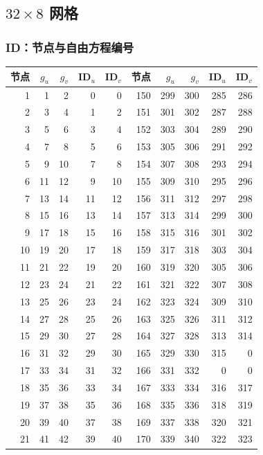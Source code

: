 \subsection{$32\times8$ 网格}
\subsubsection*{ID：节点与自由方程编号}
\small\begin{longtable}{rrrrr@{\qquad}rrrrr}
\toprule 节点 & $g_u$ & $g_v$ & ID$_u$ & ID$_v$ & 节点 & $g_u$ & $g_v$ & ID$_u$ & ID$_v$ \\ \midrule\endhead
1 & 1 & 2 & 0 & 0 & 150 & 299 & 300 & 285 & 286 \\
2 & 3 & 4 & 1 & 2 & 151 & 301 & 302 & 287 & 288 \\
3 & 5 & 6 & 3 & 4 & 152 & 303 & 304 & 289 & 290 \\
4 & 7 & 8 & 5 & 6 & 153 & 305 & 306 & 291 & 292 \\
5 & 9 & 10 & 7 & 8 & 154 & 307 & 308 & 293 & 294 \\
6 & 11 & 12 & 9 & 10 & 155 & 309 & 310 & 295 & 296 \\
7 & 13 & 14 & 11 & 12 & 156 & 311 & 312 & 297 & 298 \\
8 & 15 & 16 & 13 & 14 & 157 & 313 & 314 & 299 & 300 \\
9 & 17 & 18 & 15 & 16 & 158 & 315 & 316 & 301 & 302 \\
10 & 19 & 20 & 17 & 18 & 159 & 317 & 318 & 303 & 304 \\
11 & 21 & 22 & 19 & 20 & 160 & 319 & 320 & 305 & 306 \\
12 & 23 & 24 & 21 & 22 & 161 & 321 & 322 & 307 & 308 \\
13 & 25 & 26 & 23 & 24 & 162 & 323 & 324 & 309 & 310 \\
14 & 27 & 28 & 25 & 26 & 163 & 325 & 326 & 311 & 312 \\
15 & 29 & 30 & 27 & 28 & 164 & 327 & 328 & 313 & 314 \\
16 & 31 & 32 & 29 & 30 & 165 & 329 & 330 & 315 & 0 \\
17 & 33 & 34 & 31 & 32 & 166 & 331 & 332 & 0 & 0 \\
18 & 35 & 36 & 33 & 34 & 167 & 333 & 334 & 316 & 317 \\
19 & 37 & 38 & 35 & 36 & 168 & 335 & 336 & 318 & 319 \\
20 & 39 & 40 & 37 & 38 & 169 & 337 & 338 & 320 & 321 \\
21 & 41 & 42 & 39 & 40 & 170 & 339 & 340 & 322 & 323 \\

\end{longtable}
